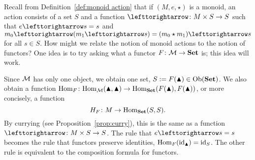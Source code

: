 \documentclass[CT4S-EN-RU]{subfiles}
\begin{document}
\begin{blockRUS}
\end{blockRUS}

\paragraph{} ~\\

\begin{blockENG}
Recall from Definition~\ref{def:monoid action} that if $(M,e,\star)$ is a monoid, an action consists of a set $S$ and a function $\acts\taking M\times S\to S$ such that $e\acts s=s$ and $m_0\acts (m_1\acts s)=(m_0\star m_1)\acts s$ for all $s\in S$. How might we relate the notion of monoid actions to the notion of functors? One idea is to try asking what a functor $F\colon\mathcal{M}\rightarrow{\mathbf{Set}}$ is; this idea will work.
\end{blockENG}

\begin{blockRUS}
\end{blockRUS}

\begin{blockENG}
Since $\mathcal{M}$ has only one object, we obtain one set, $S:=F(\blacktriangle)\in\textnormal{Ob}({\mathbf{Set}})$. We also obtain a function $\textnormal{Hom}_F\colon\textnormal{Hom}_\mathcal{M}(\blacktriangle,\blacktriangle)\rightarrow\textnormal{Hom}_{\mathbf{Set}}(F(\blacktriangle),F(\blacktriangle))$, or more concisely, a function $$H_F\colon M\rightarrow\textnormal{Hom}_{\mathbf{Set}}(S,S).$$ By currying (see Proposition~\ref{prop:curry}), this is the same as a function $\acts\taking M\times S\to S$. The rule that $e\acts s=s$ becomes the rule that functors preserve identities, $\textnormal{Hom}_F(\textnormal{id}_\blacktriangle)=\textnormal{id}_S$. The other rule is equivalent to the composition formula for functors. 
\end{blockENG}

\begin{blockRUS}
\end{blockRUS}

\paragraph{} ~\\

\end{document}
